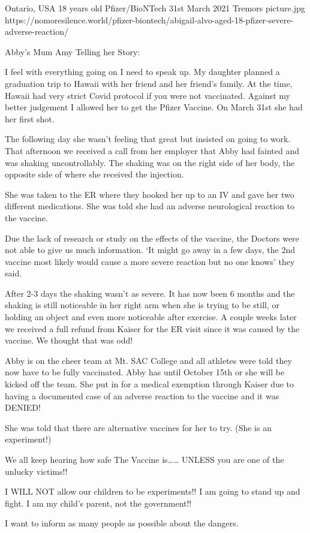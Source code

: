 {Ontario, USA}
{18 years old}
{Pfizer/BioNTech}
{31st March 2021}
{Tremors}
{picture.jpg}
{https://nomoresilence.world/pfizer-biontech/abigail-alvo-aged-18-pfizer-severe-adverse-reaction/}
{

Abby’s Mum Amy Telling her Story:

I feel with everything going on I need to speak up. My daughter planned a
graduation trip to Hawaii with her friend and her friend’s family. At the time,
Hawaii had very strict Covid protocol if you were not vaccinated. Against my
better judgement I allowed her to get the Pfizer Vaccine. On March 31st she had
her first shot.

The following day she wasn’t feeling that great but insisted on going to
work. That afternoon we received a call from her employer that Abby had fainted
and was shaking uncontrollably. The shaking was on the right side of her body,
the opposite side of where she received the injection.

She was taken to the ER where they hooked her up to an IV and gave her two
different medications. She was told she had an adverse neurological reaction to
the vaccine.

Due the lack of research or study on the effects of the vaccine, the Doctors were not able to give us much information. ‘It might go away in a few days, the 2nd vaccine most likely would cause a more severe reaction but no one knows’ they said.

After 2-3 days the shaking wasn’t as severe. It has now been 6 months and the
shaking is still noticeable in her right arm when she is trying to be still, or
holding an object and even more noticeable after exercise. A couple weeks later
we received a full refund from Kaiser for the ER visit since it was caused by
the vaccine. We thought that was odd!

Abby is on the cheer team at Mt. SAC College and all athletes were told they now
have to be fully vaccinated. Abby has until October 15th or she will be kicked
off the team. She put in for a medical exemption through Kaiser due to having a
documented case of an adverse reaction to the vaccine and it was DENIED!

She was told that there are alternative vaccines for her to try. (She is an
experiment!)

We all keep hearing how safe The Vaccine is…… UNLESS you are one of the unlucky
victims!!

I WILL NOT allow our children to be experiments!! I am going to stand up and
fight. I am my child’s parent, not the government!!

I want to inform as many people as possible about the dangers.

}
